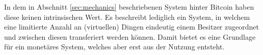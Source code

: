 In dem in Abschnitt \ref{sec:mechanics} beschriebenen System hinter Bitcoin haben diese keinen intrinsischen Wert.
Es beschreibt lediglich ein System, in welchem eine limitierte Anzahl an (virtuellen) Dingen eindeutig einem Besitzer zugeordnet und zwischen diesen transferiert werden können.
Damit bietet es eine Grundlage für ein monetäres System, welches aber erst aus der Nutzung entsteht.
